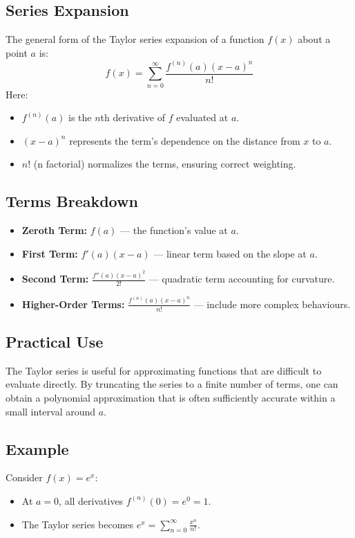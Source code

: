 \documentclass{article}
\begin{document}
\subsection{Series Expansion}
The general form of the Taylor series expansion of a function \( f(x) \) about a point \( a \) is:
\[
f(x) = \sum_{n=0}^{\infty} \frac{f^{(n)}(a)(x-a)^n}{n!}
\]
Here:
\begin{itemize}
    \item \( f^{(n)}(a) \) is the \( n \)th derivative of \( f \) evaluated at \( a \).
    \item \( (x-a)^n \) represents the term's dependence on the distance from \( x \) to \( a \).
    \item \( n! \) (n factorial) normalizes the terms, ensuring correct weighting.
\end{itemize}

\subsection{Terms Breakdown}
\begin{itemize}
    \item \textbf{Zeroth Term:} \( f(a) \) — the function's value at \( a \).
    \item \textbf{First Term:} \( f'(a)(x-a) \) — linear term based on the slope at \( a \).
    \item \textbf{Second Term:} \( \frac{f''(a)(x-a)^2}{2!} \) — quadratic term accounting for curvature.
    \item \textbf{Higher-Order Terms:} \( \frac{f^{(n)}(a)(x-a)^n}{n!} \) — include more complex behaviours.
\end{itemize}

\subsection{Practical Use}
The Taylor series is useful for approximating functions that are difficult to evaluate directly. By truncating the series to a finite number of terms, one can obtain a polynomial approximation that is often sufficiently accurate within a small interval around \( a \).

\subsection{Example}
Consider \( f(x) = e^x \):
\begin{itemize}
    \item At \( a = 0 \), all derivatives \( f^{(n)}(0) = e^0 = 1 \).
    \item The Taylor series becomes \( e^x = \sum_{n=0}^{\infty} \frac{x^n}{n!} \).
\end{itemize}
\end{document}
